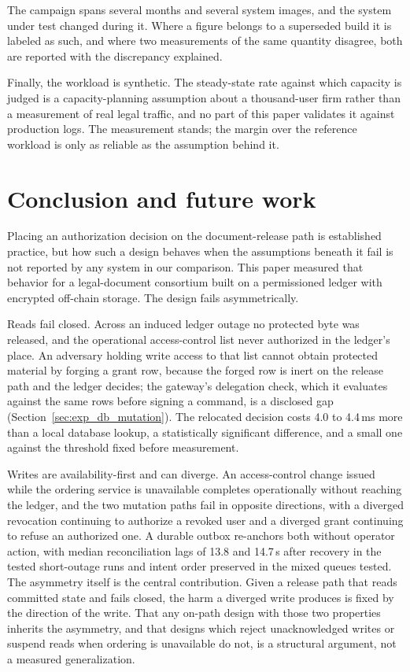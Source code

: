 \documentclass[preprint,12pt]{elsarticle}
\begin{document}
The campaign spans several months and several system images, and the system
under test changed during it. Where a figure belongs to a superseded build it
is labeled as such, and where two measurements of the same quantity disagree,
both are reported with the discrepancy explained.

Finally, the workload is synthetic. The steady-state rate against which
capacity is judged is a capacity-planning assumption about a thousand-user
firm rather than a measurement of real legal traffic, and no part of this
paper validates it against production logs. The measurement stands; the
margin over the reference workload is only as reliable as the assumption
behind it.


\section{Conclusion and future work}
\label{sec:conclusion}

Placing an authorization decision on the document-release path is established
practice, but how such a design behaves when the assumptions beneath it fail
is not reported by any system in our comparison. This paper measured that behavior for a
legal-document consortium built on a permissioned ledger with encrypted
off-chain storage. The design fails asymmetrically.

Reads fail closed. Across an induced ledger outage no protected byte was
released, and the operational access-control list never authorized in the
ledger's place. An adversary holding write access to that list cannot obtain
protected material by forging a grant row, because the forged row is inert on
the release path and the ledger decides; the gateway's delegation check, which
it evaluates against the same rows before signing a command, is a disclosed
gap (Section~\ref{sec:exp_db_mutation}). The relocated decision costs 4.0 to 4.4\,ms more than a local
database lookup, a statistically significant difference, and a small one
against the threshold fixed before measurement.

Writes are availability-first and can diverge. An access-control change issued
while the ordering service is unavailable completes operationally without
reaching the ledger, and the two mutation paths fail in opposite directions,
with a diverged revocation continuing to authorize a revoked user and a
diverged grant continuing to refuse an authorized one. A durable outbox re-anchors
both without operator action, with median reconciliation lags of 13.8 and
14.7\,s after recovery in the tested short-outage runs and intent order
preserved in the mixed queues tested. The asymmetry itself is
the central contribution. Given a release path that reads committed state and
fails closed, the harm a diverged write produces is fixed by the direction of
the write. That any on-path design with those two properties inherits the
asymmetry, and that designs which reject unacknowledged writes or suspend
reads when ordering is unavailable do not, is a structural argument, not a
measured generalization.
\end{document}
